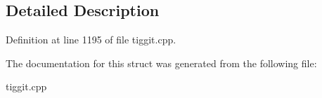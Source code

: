 \subsection{Detailed Description}


Definition at line 1195 of file tiggit.\-cpp.



The documentation for this struct was generated from the following file\-:\begin{DoxyCompactItemize}
\item 
tiggit.\-cpp\end{DoxyCompactItemize}
